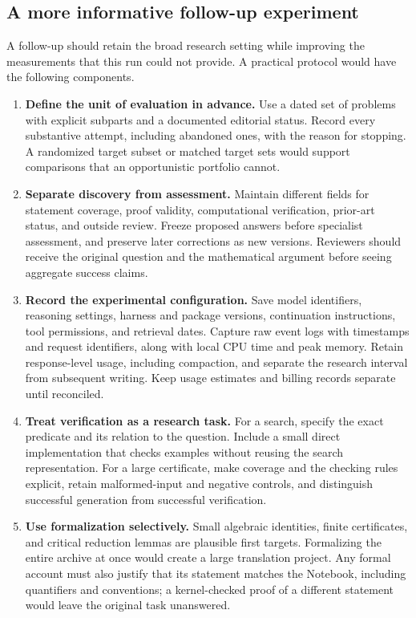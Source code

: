 \subsection{A more informative follow-up experiment}

A follow-up should retain the broad research setting while improving
the measurements that this run could not provide. A practical protocol
would have the following components.

\begin{enumerate}
\item \textbf{Define the unit of evaluation in advance.}
Use a dated set of problems with explicit subparts and a documented
editorial status. Record every substantive attempt, including abandoned
ones, with the reason for stopping. A randomized target subset or
matched target sets would support comparisons that an opportunistic
portfolio cannot.

\item \textbf{Separate discovery from assessment.}
Maintain different fields for statement coverage, proof validity,
computational verification, prior-art status, and outside review.
Freeze proposed answers before specialist assessment, and preserve
later corrections as new versions. Reviewers should receive the
original question and the mathematical argument before seeing aggregate
success claims.

\item \textbf{Record the experimental configuration.}
Save model identifiers, reasoning settings, harness and package
versions, continuation instructions, tool permissions, and retrieval
dates. Capture raw event logs with timestamps and request identifiers,
along with local CPU time and peak memory. Retain response-level usage, including compaction, and separate the
research interval from subsequent writing. Keep usage estimates and
billing records separate until reconciled.

\item \textbf{Treat verification as a research task.}
For a search, specify the exact predicate and its relation to the
question. Include a small direct implementation that checks examples
without reusing the search representation. For a large certificate,
make coverage and the checking rules explicit, retain malformed-input
and negative controls, and distinguish successful generation from
successful verification.

\item \textbf{Use formalization selectively.}
Small algebraic identities, finite certificates, and critical reduction
lemmas are plausible first targets. Formalizing the entire archive at
once would create a large translation project. Any formal account must
also justify that its statement matches the Notebook, including
quantifiers and conventions; a kernel-checked proof of a different
statement would leave the original task unanswered.


\end{enumerate}
